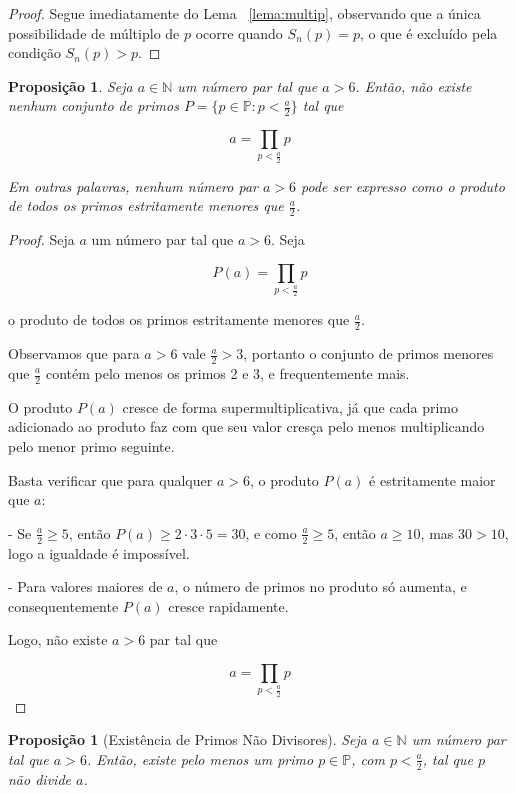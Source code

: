 \documentclass[a4paper,11pt]{article}
\newtheorem{proposition}[theorem]{Proposição}
\theoremstyle{definition}
\theoremstyle{remark}
\begin{document}
\begin{otherlanguage}{brazil}
	\begin{proof}
		Segue imediatamente do Lema ~\ref{lema:multip}, observando que a única possibilidade de múltiplo de \(p\) ocorre quando \(S_n(p) = p\), o que é excluído pela condição \(S_n(p) > p\).
	\end{proof}
	
	
	\begin{proposition}\label{prop: produto_p_menores_a_meio}
		Seja \(a \in \mathbb{N}\) um número par tal que \(a > 6\). Então, não existe nenhum conjunto de primos \(P = \{p \in \mathbb{P} : p < \frac{a}{2}\}\) tal que
		
		\[
		a = \prod_{p < \frac{a}{2}} p
		\]
		
		Em outras palavras, nenhum número par \(a > 6\) pode ser expresso como o produto de todos os primos estritamente menores que \(\frac{a}{2}\).
	\end{proposition}
	
	\begin{proof}
		Seja \(a\) um número par tal que \(a > 6\). Seja
		
		\[
		P(a) = \prod_{p < \frac{a}{2}} p
		\]
		
		o produto de todos os primos estritamente menores que \(\frac{a}{2}\).
		
		Observamos que para \(a > 6\) vale \(\frac{a}{2} > 3\), portanto o conjunto de primos menores que \(\frac{a}{2}\) contém pelo menos os primos 2 e 3, e frequentemente mais.
		
		O produto \(P(a)\) cresce de forma supermultiplicativa, já que cada primo adicionado ao produto faz com que seu valor cresça pelo menos multiplicando pelo menor primo seguinte.
		
		Basta verificar que para qualquer \(a > 6\), o produto \(P(a)\) é estritamente maior que \(a\):
		
		- Se \(\frac{a}{2} \geq 5\), então \(P(a) \geq 2 \cdot 3 \cdot 5 = 30\), e como \(\frac{a}{2} \geq 5\), então \(a \geq 10\), mas \(30 > 10\), logo a igualdade é impossível.
		
		- Para valores maiores de \(a\), o número de primos no produto só aumenta, e consequentemente \(P(a)\) cresce rapidamente.
		
		Logo, não existe \(a > 6\) par tal que
		
		\[
		a = \prod_{p < \frac{a}{2}} p
		\]
		
	\end{proof}
	
	\begin{proposition}[Existência de Primos Não Divisores]\label{prop:existencia_de_primos_nao_divisores}
		Seja \(a \in \mathbb{N}\) um número par tal que \(a > 6\). Então, existe pelo menos um primo \(p \in \mathbb{P}\), com \(p < \frac{a}{2}\), tal que \(p\) não divide \(a\).
	\end{proposition}
	

\end{otherlanguage}
\end{document}
